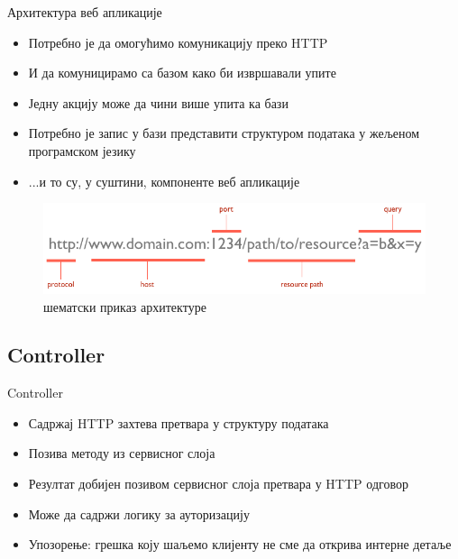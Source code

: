 \documentclass{beamer}
\begin{document}
    \begin{frame}[allowframebreaks]{Архитектура веб апликације}
        \begin{itemize}
            \item Потребно је да омогућимо комуникацију преко HTTP
            \item И да комуницирамо са базом како би извршавали упите
            \item Једну акцију може да чини више упита ка бази
            \item Потребно је запис у бази представити структуром података у жељеном програмском језику
            \item ...и то су, у суштини, компоненте веб апликације
        \end{itemize}
        
        \framebreak
        
        \begin{figure}
            \centering
            \includegraphics[width=\textwidth,height=\textheight,keepaspectratio]{images/url.png}
            \caption{шематски приказ архитектуре}
            \label{fig:url}
        \end{figure}
    \end{frame}
    
    \subsection{Controller}
    
    \begin{frame}{Controller}
        \begin{itemize}
            \item Садржај HTTP захтева претвара у структуру података
            \item Позива методу из сервисног слоја
            \item Резултат добијен позивом сервисног слоја претвара у HTTP одговор
            \item Може да садржи логику за ауторизацију
            \item Упозорење: грешка коју шаљемо клијенту не сме да открива интерне детаље
        \end{itemize}
    \end{frame}
    
\end{document}
